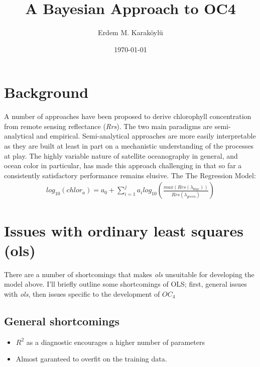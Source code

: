 \documentclass[10pt]{article}
\begin{document}
\author{Erdem M. Karaköylü}
\title{A Bayesian Approach to OC4}
\date{\today}
\maketitle
\tableofcontents
\newpage

\newcommand{\reddash}{\raisebox{2pt}{\tikz{\draw[-,red,dashed,line width=1.2pt](0,0) -- (5mm,0);}}}
\newcommand{\blkdash}{\raisebox{2pt}{\tikz{\draw[-,black,dashed,line width=1.2pt](0,0) -- (5mm,0);}}}
\newcommand{\blksold}{\raisebox{2pt}{\tikz{\draw[-,black,solid,line width=1.2pt](0,0) -- (5mm,0);}}}

\section{Background}

A number of approaches have been proposed to derive chlorophyll concentration from remote sensing reflectance (\textit{Rrs}). The two main paradigms are semi-analytical and empirical. Semi-analytical approaches are more easily interpretable as they are built at least in part on a mechanistic understanding of the processes at play. The highly variable nature of satellite oceanography in general, and ocean color in particular, has made this approach challenging in that so far a consistently satisfactory performance remains elusive. The 
The Regression Model:
\begin{align}
log_{10}\left(chlor_a\right) = a_0 + \sum_{i=1}^ja_ilog_{10}\left(\frac{max\left(Rrs\left(\lambda_{blue}\right)\right)}{Rrs\left(\lambda_{green}\right)}\right)
\end{align}


\section{Issues with ordinary least squares (ols)}
There are a number of shortcomings that makes \textit{ols} unsuitable for developing the model above. I'll briefly outline some shortcomings of OLS; first, general issues with \textit{ols}, then issues specific to the development of $OC_4$
	\subsection{General shortcomings}
	\begin{itemize}
		\item $R^2$ as a diagnostic encourages a higher number of parameters
		\item Almost garanteed to overfit on the training data.
	\end{itemize}
	
\end{document}
